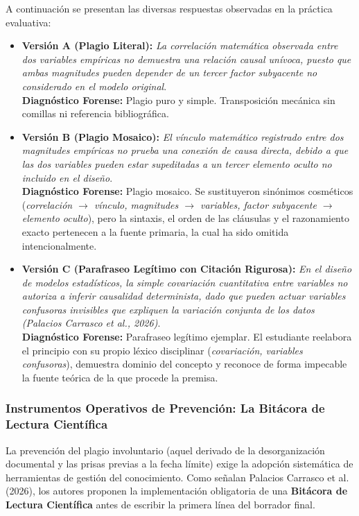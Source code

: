 A continuación se presentan las diversas respuestas observadas en la práctica evaluativa:
\begin{itemize}
    \item \textbf{Versión A (Plagio Literal):} \textsl{\guillemotleft La correlación matemática observada entre dos variables empíricas no demuestra una relación causal unívoca, puesto que ambas magnitudes pueden depender de un tercer factor subyacente no considerado en el modelo original\guillemotright}.\\
    \textbf{Diagnóstico Forense:} Plagio puro y simple. Transposición mecánica sin comillas ni referencia bibliográfica.
    \item \textbf{Versión B (Plagio Mosaico):} \textsl{\guillemotleft El vínculo matemático registrado entre dos magnitudes empíricas no prueba una conexión de causa directa, debido a que las dos variables pueden estar supeditadas a un tercer elemento oculto no incluido en el diseño\guillemotright}.\\
    \textbf{Diagnóstico Forense:} Plagio mosaico. Se sustituyeron sinónimos cosméticos (\textsl{correlación $\rightarrow$ vínculo, magnitudes $\rightarrow$ variables, factor subyacente $\rightarrow$ elemento oculto}), pero la sintaxis, el orden de las cláusulas y el razonamiento exacto pertenecen a la fuente primaria, la cual ha sido omitida intencionalmente.
    \item \textbf{Versión C (Parafraseo Legítimo con Citación Rigurosa):} \textsl{\guillemotleft En el diseño de modelos estadísticos, la simple covariación cuantitativa entre variables no autoriza a inferir causalidad determinista, dado que pueden actuar variables confusoras invisibles que expliquen la variación conjunta de los datos (Palacios Carrasco et al., 2026)\guillemotright}.\\
    \textbf{Diagnóstico Forense:} Parafraseo legítimo ejemplar. El estudiante reelabora el principio con su propio léxico disciplinar (\textsl{covariación, variables confusoras}), demuestra dominio del concepto y reconoce de forma impecable la fuente teórica de la que procede la premisa.
\end{itemize}

\subsubsection{Instrumentos Operativos de Prevención: La Bitácora de Lectura Científica}

La prevención del plagio involuntario (aquel derivado de la desorganización documental y las prisas previas a la fecha límite) exige la adopción sistemática de herramientas de gestión del conocimiento. Como señalan Palacios Carrasco et al. (2026), los autores proponen la implementación obligatoria de una \textbf{Bitácora de Lectura Científica} antes de escribir la primera línea del borrador final.

